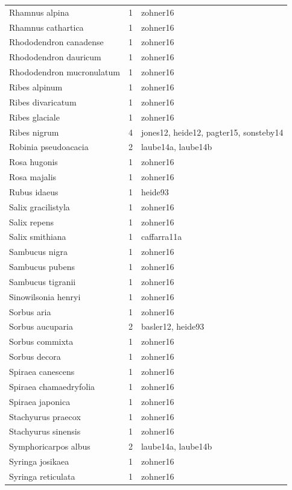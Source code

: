 \documentclass{article}
\begin{document}
\begin{footnotesize}
\begin{longtable}{|p{}|p{}|p{}|}
  Rhamnus alpina &   1 & zohner16 \\ 
  Rhamnus cathartica &   1 & zohner16 \\ 
  Rhododendron canadense &   1 & zohner16 \\ 
  Rhododendron dauricum &   1 & zohner16 \\ 
  Rhododendron mucronulatum &   1 & zohner16 \\ 
  Ribes alpinum &   1 & zohner16 \\ 
  Ribes divaricatum &   1 & zohner16 \\ 
  Ribes glaciale &   1 & zohner16 \\ 
  Ribes nigrum &   4 & jones12, heide12, pagter15, sonsteby14 \\ 
  Robinia pseudoacacia &   2 & laube14a, laube14b \\ 
  Rosa hugonis &   1 & zohner16 \\ 
  Rosa majalis &   1 & zohner16 \\ 
  Rubus idaeus &   1 & heide93 \\ 
  Salix gracilistyla &   1 & zohner16 \\ 
  Salix repens &   1 & zohner16 \\ 
  Salix smithiana &   1 & caffarra11a \\ 
  Sambucus nigra &   1 & zohner16 \\ 
  Sambucus pubens &   1 & zohner16 \\ 
  Sambucus tigranii &   1 & zohner16 \\ 
  Sinowilsonia henryi &   1 & zohner16 \\ 
  Sorbus aria &   1 & zohner16 \\ 
  Sorbus aucuparia &   2 & basler12, heide93 \\ 
  Sorbus commixta &   1 & zohner16 \\ 
  Sorbus decora &   1 & zohner16 \\ 
  Spiraea canescens &   1 & zohner16 \\ 
  Spiraea chamaedryfolia &   1 & zohner16 \\ 
  Spiraea japonica &   1 & zohner16 \\ 
  Stachyurus praecox &   1 & zohner16 \\ 
  Stachyurus sinensis &   1 & zohner16 \\ 
  Symphoricarpos albus &   2 & laube14a, laube14b \\ 
  Syringa josikaea &   1 & zohner16 \\ 
  Syringa reticulata &   1 & zohner16 \\ 

\end{longtable}
\end{footnotesize}
\end{document}
